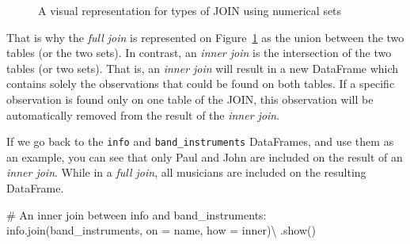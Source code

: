 \documentclass[
  11pt,
  letterpaper,
  DIV=11,
  numbers=noendperiod]{scrreprt}
\newenvironment{Shaded}{\begin{snugshade}}{\end{snugshade}}
\newcommand{\CommentTok}[1]{\textcolor[rgb]{0.37,0.37,0.37}{#1}}
\newcommand{\NormalTok}[1]{\textcolor[rgb]{0.00,0.23,0.31}{#1}}
\newcommand{\OperatorTok}[1]{\textcolor[rgb]{0.37,0.37,0.37}{#1}}
\newcommand{\StringTok}[1]{\textcolor[rgb]{0.13,0.47,0.30}{#1}}
\begin{document}
\begin{figure}


\caption{\label{fig-join-sets}A visual representation for types of JOIN
using numerical sets}

\end{figure}%

That is why the \emph{full join} is represented on
Figure~\ref{fig-join-sets} as the union between the two tables (or the
two sets). In contrast, an \emph{inner join} is the intersection of the
two tables (or two sets). That is, an \emph{inner join} will result in a
new DataFrame which contains solely the observations that could be found
on both tables. If a specific observation is found only on one table of
the JOIN, this observation will be automatically removed from the result
of the \emph{inner join}.

If we go back to the \texttt{info} and \texttt{band\_instruments}
DataFrames, and use them as an example, you can see that only Paul and
John are included on the result of an \emph{inner join}. While in a
\emph{full join}, all musicians are included on the resulting DataFrame.

\begin{Shaded}
\begin{Highlighting}[]
\CommentTok{\# An inner join between \textasciigrave{}info\textasciigrave{} and \textasciigrave{}band\_instruments\textasciigrave{}:}
\NormalTok{info.join(band\_instruments, on }\OperatorTok{=} \StringTok{\textquotesingle{}name\textquotesingle{}}\NormalTok{, how }\OperatorTok{=} \StringTok{\textquotesingle{}inner\textquotesingle{}}\NormalTok{)}\OperatorTok{\textbackslash{}}
\NormalTok{    .show()}
\end{Highlighting}
\end{Shaded}
\end{document}
